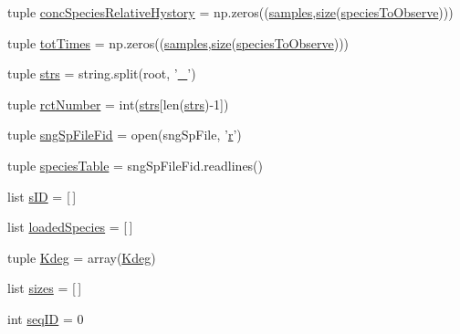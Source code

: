 \begin{DoxyCompactItemize}
tuple \hyperlink{namespacegeneral_statistics_ae67f4c2cba55845d070f6b0c783ad6fb}{conc\-Species\-Relative\-Hystory} = np.\-zeros((\hyperlink{namespacegeneral_statistics_a0f3c6fa133cfbef06ffd82dfbef8ace4}{samples},\hyperlink{crea__e__controlla__i__catalizzatori_8m_ae113ea7f9e515a12ac4b5595c6faf61e}{size}(\hyperlink{namespacegeneral_statistics_acfada06fea0c10e3f1eea8b9cdde37e3}{species\-To\-Observe})))
\item 
tuple \hyperlink{namespacegeneral_statistics_a0478def357ccc1565f0e5749605a7f7f}{tot\-Times} = np.\-zeros((\hyperlink{namespacegeneral_statistics_a0f3c6fa133cfbef06ffd82dfbef8ace4}{samples},\hyperlink{crea__e__controlla__i__catalizzatori_8m_ae113ea7f9e515a12ac4b5595c6faf61e}{size}(\hyperlink{namespacegeneral_statistics_acfada06fea0c10e3f1eea8b9cdde37e3}{species\-To\-Observe})))
\item 
tuple \hyperlink{namespacegeneral_statistics_ab65e4a0772acf69489feaf7a723dd18a}{strs} = string.\-split(root, '\hyperlink{start_8m_a280c5f85d1264d1df5d06bc5ea8b550c}{\-\_\-}')
\item 
tuple \hyperlink{namespacegeneral_statistics_ab24b721d76ddf791f3097efe4da17080}{rct\-Number} = int(\hyperlink{namespacegeneral_statistics_ab65e4a0772acf69489feaf7a723dd18a}{strs}\mbox{[}len(\hyperlink{namespacegeneral_statistics_ab65e4a0772acf69489feaf7a723dd18a}{strs})-\/1\mbox{]})
\item 
tuple \hyperlink{namespacegeneral_statistics_abc048a358e184e9fb3b68f18c254a5f0}{sng\-Sp\-File\-Fid} = open(sng\-Sp\-File, '\hyperlink{_k_s_search_launcher_8m_ac862e7284527eb913b1351c8bfb8e079}{r}')
\item 
tuple \hyperlink{namespacegeneral_statistics_a1ae65ffff7c2a91a33059633266d7b4c}{species\-Table} = sng\-Sp\-File\-Fid.\-readlines()
\item 
list \hyperlink{namespacegeneral_statistics_a3796f56e86ab8d479fbfeb68a5f67b01}{s\-I\-D} = \mbox{[}$\,$\mbox{]}
\item 
list \hyperlink{namespacegeneral_statistics_af29ad6a22b3f3465af2fe01a8e83b7e5}{loaded\-Species} = \mbox{[}$\,$\mbox{]}
\item 
tuple \hyperlink{namespacegeneral_statistics_ac869e7a93953327296c2c2840049f28b}{\-Kdeg} = array(\hyperlink{namespacegeneral_statistics_ac869e7a93953327296c2c2840049f28b}{\-Kdeg})
\item 
list \hyperlink{namespacegeneral_statistics_a2ddfeb15247fcd76c5799776c251d274}{sizes} = \mbox{[}$\,$\mbox{]}
\item 
int \hyperlink{namespacegeneral_statistics_a7f7cffe1bc7c0281cbf5c6c41582d50d}{seq\-I\-D} = 0

\end{DoxyCompactItemize}
